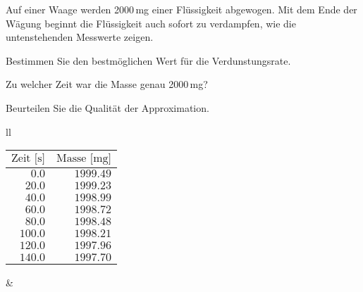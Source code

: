 Auf einer Waage werden 2000\,mg einer Flüssigkeit abgewogen.
Mit dem Ende der Wägung beginnt die Flüssigkeit auch sofort zu
verdampfen, wie die untenstehenden Messwerte zeigen.
\begin{teilaufgaben}
\item Bestimmen Sie den bestmöglichen Wert für die Verdunstungsrate.
\item Zu welcher Zeit war die Masse genau 2000\,mg?
\item Beurteilen Sie die Qualität der Approximation.
\end{teilaufgaben}

\begin{center}
\begin{tabular}{ll}
\begin{minipage}{5cm}
\begin{center}
\begin{tabular}{|>{$}r<{$}|>{$}r<{$}|}
\hline
\text{Zeit [s]}&\text{Masse [mg]}\\
\hline
  0.0&1999.49\\
 20.0&1999.23\\
 40.0&1998.99\\
 60.0&1998.72\\
 80.0&1998.48\\
100.0&1998.21\\
120.0&1997.96\\
140.0&1997.70\\
\hline
\end{tabular}
\end{center}
\end{minipage}&%
\begin{minipage}{9cm}
\begin{center}
\end{center}
\end{minipage}
\end{tabular}
\end{center}


